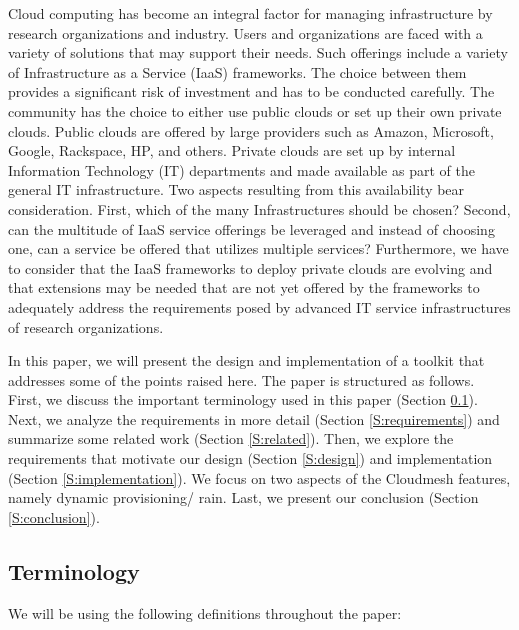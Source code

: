 \documentclass{tex/sig-alternate-2013}
\begin{document}
Cloud computing has become an integral factor for managing
infrastructure by research organizations and industry. Users and
organizations are faced with a variety of solutions that may support
their needs. Such offerings include a variety of Infrastructure as a
Service (IaaS) frameworks. The choice between them provides a
significant risk of investment and has to be conducted carefully. The
community has the choice to either use public clouds or set up their
own private clouds. Public clouds are offered by large providers such
as Amazon, Microsoft, Google, Rackspace, HP, and others. Private
clouds are set up by internal Information Technology (IT) departments
and made available as part of the general IT infrastructure. Two
aspects resulting from this availability bear consideration. First,
which of the many Infrastructures should be chosen? Second, can the
multitude of IaaS service offerings be leveraged and instead of
choosing one, can a service be offered that utilizes multiple
services? Furthermore, we have to consider that the IaaS frameworks to
deploy private clouds are evolving and that extensions may be needed
that are not yet offered by the frameworks to adequately address the
requirements posed by advanced IT service infrastructures of research
organizations.

In this paper, we will present the design and implementation of a
toolkit that addresses some of the points raised here.  The paper is
structured as follows. First, we discuss the important terminology
used in this paper (Section \ref{S:terminology}).  Next, we analyze
the requirements in more detail (Section \ref{S:requirements}) and
summarize some related work (Section \ref{S:related}).  Then, we
explore the requirements that motivate our design (Section
\ref{S:design}) and implementation (Section \ref{S:implementation}).
We focus on two aspects of the Cloudmesh features, namely dynamic
provisioning/ rain. Last, we present our conclusion (Section
\ref{S:conclusion}).



\subsection{Terminology} \label{S:terminology}

We will be using the following definitions throughout the paper:
\end{document}
